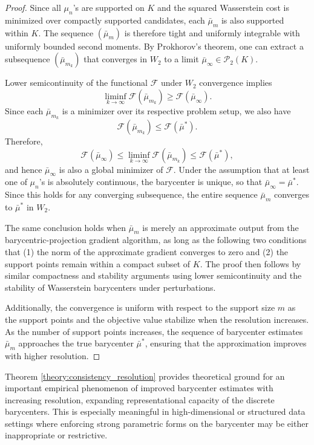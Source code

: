 \documentclass[11pt]{article}
\begin{document}
\begin{proof}
    Since all \(\mu_n\)'s are supported on \(K\) and the squared Wasserstein cost is minimized over compactly supported candidates, each \(\bar{\mu}_m\) is also supported within \(K\). The sequence \(( \bar{\mu}_m)\) is therefore tight and uniformly integrable with uniformly bounded second moments. By Prokhorov's theorem, one can extract a subsequence \((\bar{\mu}_{m_k})\) that converges in \(W_2\) to a limit \(\bar{\mu}_\infty \in \mathcal{P}_2(K)\). 

    Lower semicontinuity of the functional \(\mathcal{F}\) under \(W_2\) convergence implies 
    \[
    \liminf_{k \to \infty} \mathcal{F}(\bar{\mu}_{m_k}) \geq \mathcal{F}(\bar{\mu}_\infty).
    \]
    Since each \(\bar{\mu}_{m_k}\) is a minimizer over its respective problem setup, we also have 
    \[
    \mathcal{F}(\bar{\mu}_{m_k}) \leq \mathcal{F}(\bar{\mu}^*).
    \]
    Therefore, 
    \[
    \mathcal{F}(\bar{\mu}_\infty) \leq \liminf_{k \to \infty} \mathcal{F}(\bar{\mu}_{m_k}) \leq \mathcal{F}(\bar{\mu}^*),
    \]
    and hence \(\bar{\mu}_\infty\) is also a global minimizer of \(\mathcal{F}\). Under the assumption that at least one of \(\mu_n\)'s is absolutely continuous, the barycenter is unique, so that \(\bar{\mu}_\infty = \bar{\mu}^*\). Since this holds for any converging subsequence, the entire sequence \(\bar{\mu}_m\) converges to \(\bar{\mu}^*\) in \(W_2\).

    The same conclusion holds when \(\bar{\mu}_m\) is merely an approximate output from the barycentric-projection gradient algorithm, as long as the following two conditions that (1) the norm of the approximate gradient converges to zero and (2) the support points remain within a compact subset of \(K\).
    The proof then follows by similar compactness and stability arguments using lower semicontinuity and the stability of Wasserstein barycenters under perturbations.
    
    Additionally, the convergence is uniform with respect to the support size \(m\) as the support points and the objective value stabilize when the resolution increases. As the number of support points increases, the sequence of barycenter estimates \(\bar{\mu}_m\) approaches the true barycenter \(\bar{\mu}^*\), ensuring that the approximation improves with higher resolution.
\end{proof}



Theorem \ref{theory:consistency_resolution} provides theoretical ground for an important empirical phenomenon of improved barycenter estimates with increasing resolution, expanding representational capacity of the discrete barycenters. This is especially meaningful in high-dimensional or structured data settings where enforcing strong parametric forms on the barycenter may be either inappropriate or restrictive. 
\end{document}
